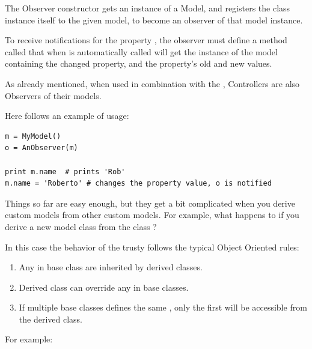 The Observer constructor gets an instance of a Model, and registers the
class instance itself to the given model, to become an observer of
that model instance.

To receive notifications for the property , the
observer must define a method called
 that when is automatically
called will get the instance of the model containing the changed
property, and the property's old and new values.

As already mentioned, when used in combination with the \mvc,
Controllers are also Observers of their models.

Here follows an example of usage:
{ \codesize 
\begin{verbatim} 
m = MyModel()
o = AnObserver(m)

print m.name  # prints 'Rob'
m.name = 'Roberto' # changes the property value, o is notified
\end{verbatim}
}

Things so far are easy enough, but they get a bit complicated when you
derive custom models from other custom models.  For example, what
happens to \OP if you derive a new model class from the class
?

In this case the behavior of the \OP trusty follows the typical Object
Oriented rules:
\begin{enumerate}
    \item Any \OP in base class are inherited by derived classes.
    \item Derived class can override any \OP in base classes.
    \item If multiple base classes defines the same \OP, only the
      first \OP will be accessible from the derived class.
\end{enumerate}

For example:

